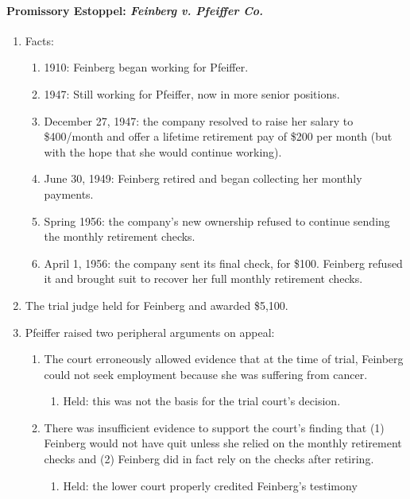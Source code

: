 \paragraph{Promissory Estoppel: \emph{Feinberg v. Pfeiffer Co.}}

\begin{enumerate}
    \item Facts:
    \begin{enumerate}
        \item 1910: Feinberg began working for Pfeiffer.
        \item 1947: Still working for Pfeiffer, now in more senior positions.
        \item December 27, 1947: the company resolved to raise her salary to 
        \$400/month and offer a lifetime retirement pay of \$200 per month 
        (but with the hope that she would continue working).
        \item June 30, 1949: Feinberg retired and began collecting her monthly 
        payments.
        \item Spring 1956: the company's new ownership refused to continue 
        sending the monthly retirement checks.
        \item April 1, 1956: the company sent its final check, for \$100. 
        Feinberg refused it and brought suit to recover her full monthly 
        retirement checks.
    \end{enumerate}
    \item The trial judge held for Feinberg and awarded \$5,100.
    \item Pfeiffer raised two peripheral arguments on appeal:
    \begin{enumerate}
        \item The court erroneously allowed evidence that at the time of 
        trial, Feinberg could not seek employment because she was suffering 
        from cancer.
        \begin{enumerate}
            \item Held: this was not the basis for the trial court's decision.
        \end{enumerate}
        \item There was insufficient evidence to support the court's finding 
        that (1) Feinberg would not have quit unless she relied on the monthly 
        retirement checks and (2) Feinberg did in fact rely on the checks 
        after retiring.
        \begin{enumerate}
            \item Held: the lower court properly credited Feinberg's testimony 

\end{enumerate}
\end{enumerate}
\end{enumerate}
